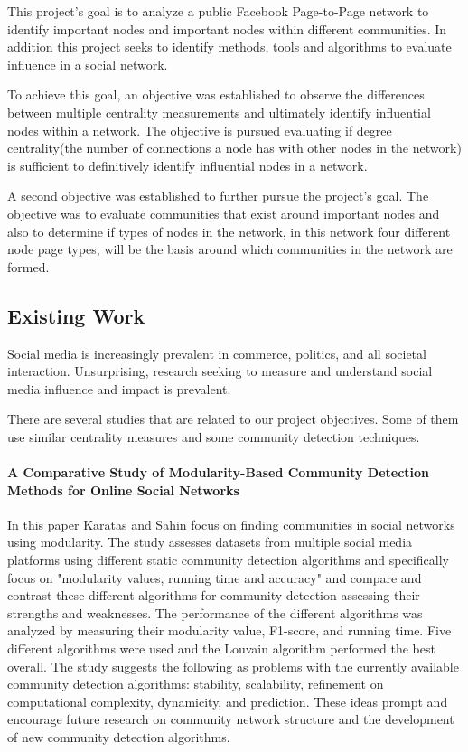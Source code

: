 \documentclass[11pt,twocolumn]{article}
\begin{document}
This project's goal is to analyze a public Facebook Page-to-Page network to identify important nodes and important nodes within different communities. In addition this project seeks to identify methods, tools and algorithms to evaluate influence in a social network. 

To achieve this goal, an objective was established to observe the differences between multiple centrality measurements and ultimately identify influential nodes within a network. The objective is pursued evaluating if degree centrality(the number of connections a node has with other nodes in the network) is sufficient to definitively identify influential nodes in a network.


A second objective was established to further pursue the project’s goal. The objective was to evaluate communities that exist around important nodes and also to determine if types of nodes in the network, in this network four different node page types, will be the basis around which communities in the network are formed.


\subsection{Existing Work}

Social media is increasingly prevalent in commerce, politics, and all societal interaction. Unsurprising, research seeking to measure and understand social media influence and impact is prevalent. 

There are several studies that are related to our project objectives. Some of them use similar centrality measures and some community detection techniques. 

\paragraph{A Comparative Study of Modularity-Based Community Detection Methods for Online Social Networks \cite{modularity-based-community}}   
 
In this paper Karatas and Sahin focus on finding communities in social networks using modularity. The study assesses datasets from multiple social media platforms using different static community detection algorithms and specifically focus on "modularity values, running time and accuracy"\cite{modularity-based-community} and compare and contrast these different algorithms for community detection assessing their strengths and weaknesses. The performance of the different algorithms was analyzed by measuring their modularity value, F1-score, and running time. Five different algorithms were used and the Louvain algorithm performed the best overall. The study suggests the following as problems with the currently available community detection algorithms: stability, scalability, refinement on computational complexity, dynamicity, and prediction. These ideas prompt and encourage future research on community network structure and the development of new community detection algorithms.
\end{document}
